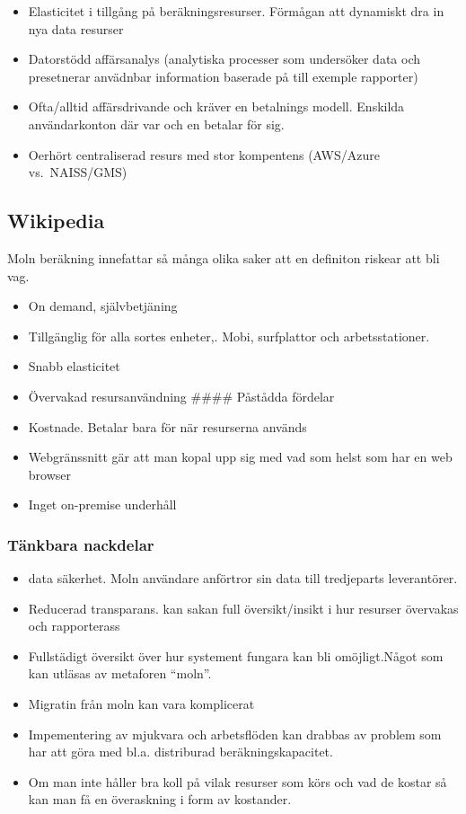 \documentclass[
  letterpaper,
  DIV=11,
  numbers=noendperiod]{scrreprt}
\providecommand{\tightlist}{%
  \setlength{\itemsep}{0pt}\setlength{\parskip}{0pt}}\usepackage{longtable,booktabs,array}
\begin{document}
\begin{itemize}
\tightlist
\item
  Elasticitet i tillgång på beräkningsresurser. Förmågan att dynamiskt
  dra in nya data resurser
\item
  Datorstödd affärsanalys (analytiska processer som undersöker data och
  presetnerar anvädnbar information baserade på till exemple rapporter)
\item
  Ofta/alltid affärsdrivande och kräver en betalnings modell. Enskilda
  användarkonton där var och en betalar för sig.
\item
  Oerhört centraliserad resurs med stor kompentens (AWS/Azure
  vs.~NAISS/GMS)
\end{itemize}

\subsection{Wikipedia}\label{wikipedia}

Moln beräkning innefattar så många olika saker att en definiton riskear
att bli vag.

\begin{itemize}
\item
  On demand, självbetjäning
\item
  Tillgänglig för alla sortes enheter,. Mobi, surfplattor och
  arbetsstationer.
\item
  Snabb elasticitet
\item
  Övervakad resursanvändning \#\#\#\# Påstådda fördelar
\item
  Kostnade. Betalar bara för när resurserna används
\item
  Webgränssnitt gär att man kopal upp sig med vad som helst som har en
  web browser
\item
  Inget on-premise underhåll
\end{itemize}

\subsubsection{Tänkbara nackdelar}\label{tuxe4nkbara-nackdelar}

\begin{itemize}
\tightlist
\item
  data säkerhet. Moln användare anförtror sin data till tredjeparts
  leverantörer.
\item
  Reducerad transparans. kan sakan full översikt/insikt i hur resurser
  övervakas och rapporterass
\item
  Fullstädigt översikt över hur systement fungara kan bli omöjligt.Något
  som kan utläsas av metaforen ``moln''.
\item
  Migratin från moln kan vara komplicerat
\item
  Impementering av mjukvara och arbetsflöden kan drabbas av problem som
  har att göra med bl.a. distriburad beräkningskapacitet.
\item
  Om man inte håller bra koll på vilak resurser som körs och vad de
  kostar så kan man få en överaskning i form av kostander.
\end{itemize}
\end{document}
